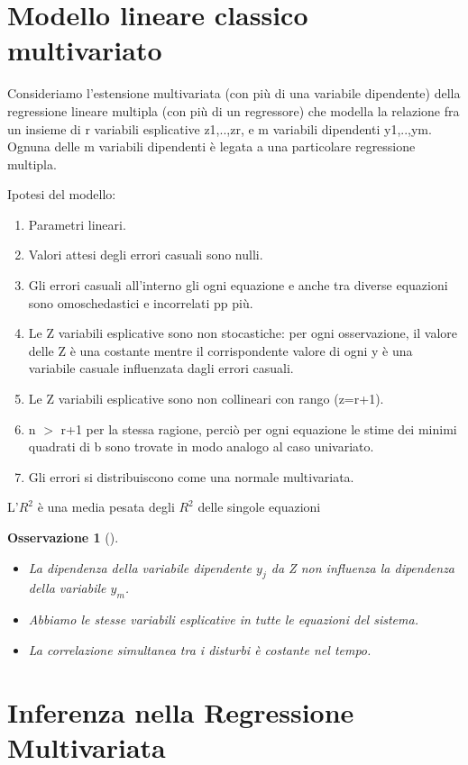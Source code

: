 \documentclass[a4page, 11pt]{article}
\newtheorem*{remark}{Osservazione}
\begin{document}
\section{Modello lineare classico multivariato}

Consideriamo l’estensione multivariata (con più di una variabile dipendente) della regressione lineare multipla (con più di un regressore) che modella la relazione fra un insieme di r variabili esplicative z1,..,zr, e m variabili dipendenti y1,..,ym. Ognuna delle m variabili dipendenti è legata a una particolare regressione multipla. 

Ipotesi del modello:
\begin{enumerate}[noitemsep]
\item Parametri lineari.
\item Valori attesi degli errori casuali sono nulli.
\item Gli errori casuali all’interno gli ogni equazione e anche tra diverse equazioni sono omoschedastici e incorrelati pp più.
\item Le Z variabili esplicative sono non stocastiche: per ogni osservazione, il valore delle Z è una costante mentre il corrispondente valore di ogni y è una variabile casuale influenzata dagli errori casuali.
\item Le Z variabili esplicative sono non collineari con rango (z=r+1).
\item n $>$ r+1 per la stessa ragione, perciò per ogni equazione le stime dei minimi quadrati di b sono trovate in modo analogo al caso univariato.
\item Gli errori si distribuiscono come una normale multivariata.
\end{enumerate}
L’$R^{2}$ è una media pesata degli $R^{2}$ delle singole equazioni

\begin{remark}[] \ \\
\begin{itemize}
\item La dipendenza della variabile dipendente $y_j$ da Z non influenza la dipendenza della variabile $y_m$.
\item Abbiamo le stesse variabili esplicative in tutte le equazioni del sistema.
\item La correlazione simultanea tra i disturbi è costante nel tempo.
\end{itemize}
\end{remark}
\section{Inferenza nella Regressione Multivariata}
\end{document}
